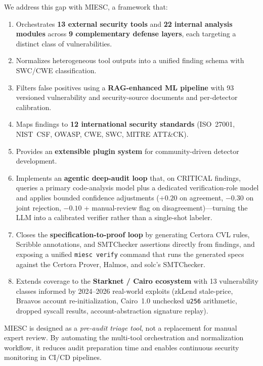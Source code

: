 \documentclass[conference]{IEEEtran}
\begin{document}
We address this gap with MIESC, a framework that:
\begin{enumerate}
    \item Orchestrates \textbf{13 external security tools} and \textbf{22 internal analysis modules} across \textbf{9 complementary defense layers}, each targeting a distinct class of vulnerabilities.
    \item Normalizes heterogeneous tool outputs into a unified finding schema with SWC/CWE classification.
    \item Filters false positives using a \textbf{RAG-enhanced ML pipeline} with 93 versioned vulnerability and security-source documents and per-detector calibration.
    \item Maps findings to \textbf{12 international security standards} (ISO~27001, NIST~CSF, OWASP, CWE, SWC, MITRE ATT\&CK).
    \item Provides an \textbf{extensible plugin system} for community-driven detector development.
    \item Implements an \textbf{agentic deep-audit loop} that, on CRITICAL findings, queries a primary code-analysis model plus a dedicated verification-role model and applies bounded confidence adjustments ($+0.20$ on agreement, $-0.30$ on joint rejection, $-0.10$ + manual-review flag on disagreement)---turning the LLM into a calibrated verifier rather than a single-shot labeler.
    \item Closes the \textbf{specification-to-proof loop} by generating Certora CVL rules, Scribble annotations, and SMTChecker assertions directly from findings, and exposing a unified \texttt{miesc verify} command that runs the generated specs against the Certora Prover, Halmos, and solc's SMTChecker.
    \item Extends coverage to the \textbf{Starknet / Cairo ecosystem} with 13 vulnerability classes informed by 2024--2026 real-world exploits (zkLend stale-price, Braavos account re-initialization, Cairo~1.0 unchecked \texttt{u256} arithmetic, dropped syscall results, account-abstraction signature replay).
\end{enumerate}

MIESC is designed as a \emph{pre-audit triage tool}, not a replacement for manual expert review. By automating the multi-tool orchestration and normalization workflow, it reduces audit preparation time and enables continuous security monitoring in CI/CD pipelines.

\end{document}
